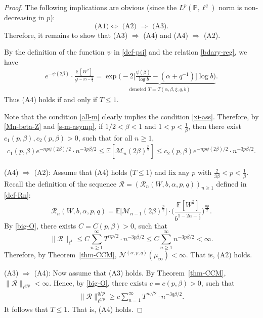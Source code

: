 \documentclass[12pt]{amsart}
\theoremstyle{definition}
\theoremstyle{remark}
\newcommand{\E}{\mathbb{E}}
\newcommand{\PP}{\mathbb{P}}
\newcommand{\NQ}{\mathcal{N}^{(\alpha, p, q)}}
\numberwithin{equation}{section}
\begin{document}
\begin{proof}
The following implications are obvious  (since the $L^p (\PP, \ell^q)$ norm is non-decreasing in $p$):
\[
\text{(A1)$\Longleftrightarrow$ (A2) $\Longrightarrow$ (A3)}.
\]
Therefore, it remains to show that (A3) $\Longrightarrow$ (A4) and (A4) $\Longrightarrow$ (A2). 

By the definition of the function $\psi$ in \eqref{def-psi} and the relation \eqref{bdary-reg}, we have 
\begin{align*}
e^{-\psi(2\beta) }   \cdot   \frac{\E[W^2]}{b^{1- 2\alpha- \frac{2}{q}}}  = \underbrace{\exp\Big(- 2 \Big[\frac{\psi(\beta)}{\log b} - (\alpha + q^{-1}) \Big] \log b \Big)}_{\text{denoted $T = T(\alpha, \beta, \xi,  q, b)$}}. 
\end{align*}
Thus (A4) holds if and only if $T\le 1$. 


Note that the condition \eqref{all-m} clearly implies the condition \eqref{xi-ass}. Therefore, by \eqref{Mn-beta-Z} and \eqref{s-m-asymp}, if $1/2<\beta<1$ and  $1<p<\frac{1}{\beta}$, then there exist $c_1(p, \beta), c_2(p, \beta)>0$, such that  for all $n\ge 1$, 
\begin{align}\label{big-O}
  c_1(p, \beta) e^{-np\psi(2\beta)/2} \cdot n^{-3p\beta/2} \le  \E[\mathscr{M}_n(2\beta)^{\frac{p}{2}}]  \le c_2(p, \beta) e^{-np\psi(2\beta)/2} \cdot n^{-3p\beta/2}. 
\end{align}

(A4) $\Longrightarrow$ (A2):  Assume that (A4)  holds ($T\le 1$) and fix any $p$ with $\frac{2}{3\beta}<p< \frac{1}{\beta}$. Recall the definition of the sequence  $\mathcal{R}= (\mathcal{R}_n(W, b, \alpha, p, q))_{n\ge 1}$ defined in \eqref{def-Rn}:
\[
\mathcal{R}_n  (W, b, \alpha, p, q)  =  \E \big[  \mathscr{M}_{n-1}(2\beta)^{\frac{p}{2}}\big] \cdot \Big(  \frac{\E[W^2]}{b^{1- 2\alpha- \frac{2}{q}}}\Big)^{\frac{np}{2}}. 
\]
 By \eqref{big-O},  there exists $C= C(p, \beta)>0$, such that 
\[
\|\mathcal{R}\|_{\ell^1} \le  C  \sum_{n\ge 1}^\infty T^{np/2} \cdot n^{-3p\beta/2} \le    C \sum_{n\ge 1}^\infty n^{-3p\beta/2}<\infty.
\]
Therefore, by  Theorem~\ref{thm-CCM},  $\NQ(\mu_\infty)<\infty$.  That is, (A2) holds. 

(A3) $\Longrightarrow$ (A4): 
Now assume that (A3) holds.  By Theorem~\ref{thm-CCM},  $\| \mathcal{R}\|_{\ell^{q/p}}<\infty$. Hence, by \eqref{big-O},  there exists $c= c(p, \beta)>0$, such that 
\begin{align*}
\| \mathcal{R}\|_{\ell^{q/p}}^{q/p} \ge  c \sum_{n=1}^\infty T^{nq/2} \cdot  n^{-3q\beta/2}.
\end{align*}
It follows that $T\le 1$.  That is, (A4) holds. 
\end{proof}
\end{document}
